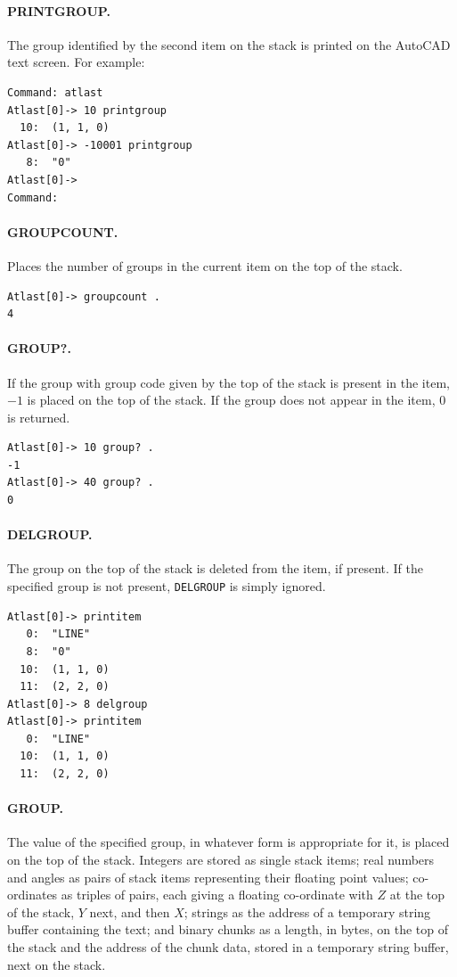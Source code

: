 \documentclass{article}
\begin{document}
\paragraph{PRINTGROUP.}
The group identified by the second item on the stack is printed
on the AutoCAD text screen.  For example:

\begin{verbatim}
Command: atlast
Atlast[0]-> 10 printgroup
  10:  (1, 1, 0)
Atlast[0]-> -10001 printgroup
   8:  "0"
Atlast[0]->
Command:
\end{verbatim}

\paragraph{GROUPCOUNT.}
Places the number of groups in the current item on the top of the
stack.

\begin{verbatim}
Atlast[0]-> groupcount .
4
\end{verbatim}

\paragraph{GROUP?.}
If the group with group code given by the top of the stack is present
in the item, $-1$ is placed on the top of the stack.  If the group
does not appear in the item, 0 is returned.

\begin{verbatim}
Atlast[0]-> 10 group? .
-1
Atlast[0]-> 40 group? .
0
\end{verbatim}

\paragraph{DELGROUP.}
The group on the top of the stack is deleted from the item, if
present.  If the specified group is not present, {\tt DELGROUP} is
simply ignored.

\begin{verbatim}
Atlast[0]-> printitem
   0:  "LINE"
   8:  "0"
  10:  (1, 1, 0)
  11:  (2, 2, 0)
Atlast[0]-> 8 delgroup
Atlast[0]-> printitem
   0:  "LINE"
  10:  (1, 1, 0)
  11:  (2, 2, 0)
\end{verbatim}

\paragraph{GROUP.}  The value of the specified group, in whatever form
is appropriate for it, is placed on the top of the stack.  Integers
are stored as single stack items; real numbers and angles as pairs of
stack items representing their floating point values; co-ordinates as
triples of pairs, each giving a floating co-ordinate with $Z$ at the
top of the stack, $Y$ next, and then $X$; strings as the address of a
temporary string buffer containing the text; and binary chunks as a
length, in bytes, on the top of the stack and the address of the chunk
data, stored in a temporary string buffer, next on the stack.
\end{document}
